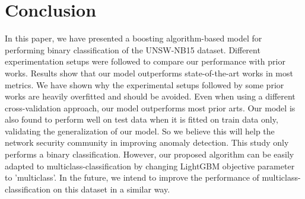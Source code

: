 \documentclass[14pt, conference]{IEEEtran}
\begin{document}
\section{Conclusion \label{conclusion}}
In this paper, we have presented a boosting algorithm-based model for performing binary classification of the UNSW-NB15 dataset.
Different experimentation setups were followed to compare our performance with prior works. Results show that our model outperforms state-of-the-art works in most metrics. We have shown why the experimental setups followed by some prior works are heavily overfitted and should be avoided. Even when using a different cross-validation approach, our model outperforms most prior arts. Our model is also found to perform well on test data when it is fitted on train data only, validating the generalization of our model. So we believe this will help the network security community in improving anomaly detection. This study only performs a binary classification. However, our proposed algorithm can be easily adapted to multiclass-classification by changing LightGBM objective parameter to 'multiclass'. In the future, we intend to improve the performance of multiclass-classification on this dataset in a similar way.



\end{document}
